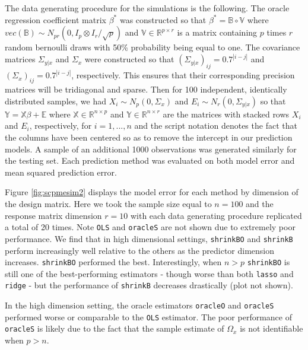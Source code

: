 \documentclass[11pt,]{report}
\theoremstyle{definition}
\theoremstyle{definition}
\theoremstyle{definition}
\theoremstyle{remark}
\begin{document}
The data generating procedure for the simulations is the following. The oracle regression coefficient matrix \(\beta^{*}\) was constructed so that \(\beta^{*} = \mathbb{B} \circ \mathbb{V}\) where \(vec\left( \mathbb{B} \right) \sim N_{pr}\left( 0, I_{p} \otimes I_{r}/\sqrt{p} \right)\) and \(\mathbb{V} \in \mathbb{R}^{p \times r}\) is a matrix containing \(p\) times \(r\) random bernoulli draws with 50\% probability being equal to one. The covariance matrices \(\Sigma_{y | x}\) and \(\Sigma_{x}\) were constructed so that \(\left( \Sigma_{y | x} \right)_{ij} = 0.7^{\left| i - j \right|}\) and \(\left( \Sigma_{x} \right)_{ij} = 0.7^{\left| i - j \right|}\), respectively. This ensures that their corresponding precision matrices will be tridiagonal and sparse. Then for 100 independent, identically distributed samples, we had \(X_{i} \sim N_{p}\left( 0, \Sigma_{x} \right)\) and \(E_{i} \sim N_{r}\left( 0, \Sigma_{y | x} \right)\) so that \(\mathbb{Y} = \mathbb{X}\beta + \mathbb{E}\) where \(\mathbb{X} \in \mathbb{R}^{n \times p}\) and \(\mathbb{Y} \in \mathbb{R}^{n \times r}\) are the matrices with stacked rows \(X_{i}\) and \(E_{i}\), respectively, for \(i = 1, ..., n\) and the script notation denotes the fact that the columns have been centered so as to remove the intercept in our prediction models. A sample of an additional 1000 observations was generated similarly for the testing set. Each prediction method was evaluated on both model error and mean squared prediction error.

Figure \ref{fig:scpmesim2} displays the model error for each method by dimension of the design matrix. Here we took the sample size equal to \(n = 100\) and the response matrix dimension \(r = 10\) with each data generating procedure replicated a total of 20 times. Note \texttt{OLS} and \texttt{oracleS} are not shown due to extremely poor performance. We find that in high dimensional settings, \texttt{shrinkBO} and \texttt{shrinkB} perform increasingly well relative to the others as the predictor dimension increases. \texttt{shrinkBO} performed the best. Interestingly, when \(n > p\) \texttt{shrinkBO} is still one of the best-performing estimators - though worse than both \texttt{lasso} and \texttt{ridge} - but the performance of \texttt{shrinkB} decreases drastically (plot not shown).

In the high dimension setting, the oracle estimators \texttt{oracleO} and \texttt{oracleS} performed worse or comparable to the \texttt{OLS} estimator. The poor performance of \texttt{oracleS} is likely due to the fact that the sample estimate of \(\Omega_{x}\) is not identifiable when \(p > n\).
\end{document}
